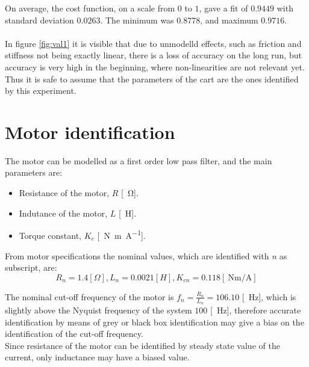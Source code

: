 On average, the cost function, on a scale from $0$ to $1$, gave a fit of $ 0.9449$ with standard deviation $0.0263$.
The minimum was $0.8778$, and maximum $ 0.9716$. \\ \\ 
In figure \ref{fig:val1} it is visible that due to unmodelld effects, such as friction and stiffness not being exactly linear, there is a loss of accuracy on the long run, but accuracy is very high in the beginning, where non-linearities are not relevant yet. Thus it is safe to assume that the parameters of the cart are the ones identified by this experiment.
\newpage

\section{Motor identification}
\label{sec:motor_id}
The motor can be modelled as a first order low pass filter, and the main parameters are:
\begin{itemize}
\item Resistance of the motor, $R$ [\SI{}{\ohm}].
\item Indutance of the motor, $L$ [\SI{}{\henry}].
\item Torque constant, $K_e$ [\SI{}{\newton \metre \per \ampere}].
\end{itemize}
From motor specifications the nominal values, which are identified with \emph{n} as subscript, are:
$$R_n = 1.4 [\Omega], L_n = 0.0021 [H], K_{en} =0.118 [\SI{}{\newton\metre \per\ampere}]$$

The nominal cut-off frequency of the motor  is $f_n = 	\frac{R_n}{L_n} = 106.10$ [\SI{}{\hertz}], which is slightly above the Nyquist frequency of the system $100$ [\SI{}{\hertz}], therefore accurate identification by means of grey or black box identification may give a bias on the identification of the cut-off frequency. \\ Since resistance of the motor can be identified by  steady state value of the current, only inductance may have a biased value. \\ \\

